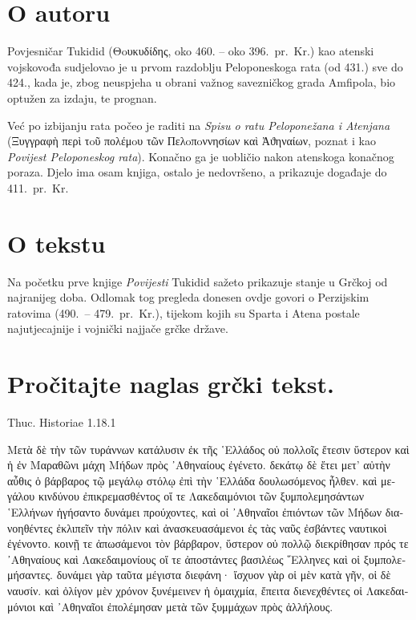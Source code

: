 \section*{O autoru}

Povjesničar Tukidid \textgreek[variant=ancient]{(Θoυκυδίδης,} oko 460. – oko 396.\ pr.~Kr.) kao atenski vojskovođa sudjelovao je u prvom razdoblju Peloponeskoga rata (od 431.) sve do 424., kada je, zbog neuspjeha u obrani važnog savezničkog grada Amfipola, bio optužen za izdaju, te prognan.

Već po izbijanju rata počeo je raditi na \textit{Spisu o ratu Peloponežana i Atenjana} \textgreek[variant=ancient]{(Ξυγγραφὴ περὶ τoῦ πολέμoυ τῶν Пελoπoννησίων καὶ Ἀϑηναίων,} poznat i kao \textit{Povijest Peloponeskog rata}). Konačno ga je uobličio nakon atenskoga konačnog poraza. Djelo ima osam knjiga, ostalo je nedovršeno, a prikazuje događaje do 411.\ pr.~Kr.

\section*{O tekstu}

Na početku prve knjige \textit{Povijesti} Tukidid sažeto prikazuje stanje u Grčkoj od najranijeg doba. Odlomak tog pregleda donesen ovdje govori o Perzijskim ratovima (490.\ – 479.\ pr.~Kr.), tijekom kojih su Sparta i Atena postale najutjecajnije i vojnički najjače grčke države.

\newpage

\section*{Pročitajte naglas grčki tekst.}

Thuc. Historiae 1.18.1

\medskip

{\large
\begin{greek}
\noindent Μετὰ δὲ τὴν τῶν τυράννων κατάλυσιν ἐκ τῆς ῾Ελλάδος οὐ πολλοῖς ἔτεσιν ὕστερον καὶ ἡ ἐν Μαραθῶνι μάχη Μήδων πρὸς ᾿Αθηναίους ἐγένετο. δεκάτῳ δὲ ἔτει μετ' αὐτὴν αὖθις ὁ βάρβαρος τῷ μεγάλῳ στόλῳ ἐπὶ τὴν ῾Ελλάδα δουλωσόμενος ἦλθεν. καὶ μεγάλου κινδύνου ἐπικρεμασθέντος οἵ τε Λακεδαιμόνιοι τῶν ξυμπολεμησάντων ῾Ελλήνων ἡγήσαντο δυνάμει προύχοντες, καὶ οἱ ᾿Αθηναῖοι ἐπιόντων τῶν Μήδων διανοηθέντες ἐκλιπεῖν τὴν πόλιν καὶ ἀνασκευασάμενοι ἐς τὰς ναῦς ἐσβάντες ναυτικοὶ ἐγένοντο. κοινῇ τε ἀπωσάμενοι τὸν βάρβαρον, ὕστερον οὐ πολλῷ διεκρίθησαν πρός τε ᾿Αθηναίους καὶ Λακεδαιμονίους οἵ τε ἀποστάντες βασιλέως ῞Ελληνες καὶ οἱ ξυμπολεμήσαντες. δυνάμει γὰρ ταῦτα μέγιστα διεφάνη· ἴσχυον γὰρ οἱ μὲν κατὰ γῆν, οἱ δὲ ναυσίν. καὶ ὀλίγον μὲν χρόνον ξυνέμεινεν ἡ ὁμαιχμία, ἔπειτα διενεχθέντες οἱ Λακεδαιμόνιοι καὶ ᾿Αθηναῖοι ἐπολέμησαν μετὰ τῶν ξυμμάχων πρὸς ἀλλήλους.
\end{greek}

}

